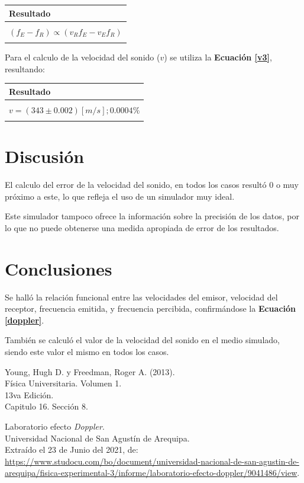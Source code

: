 \documentclass[letter,11pt]{article}
\begin{document}
\begin{center}
\begin{tabular}{|>{\centering}m{9.2cm}<{\centering}|}
\hline
\textbf{Resultado} 
\tabularnewline \hline
\\
$(f_E - f_R) \propto (v_R f_E - v_E f_R)$ \tabularnewline
\\
\hline
\end{tabular}
\end{center}

Para el calculo de la velocidad del sonido ($v$) se utiliza la
\textbf{Ecuación \ref{v3}}, resultando:

\begin{center}
\begin{tabular}{|>{\centering}m{9.2cm}<{\centering}|}
\hline
\textbf{Resultado} 
\tabularnewline \hline
\\
$v = (343 \pm 0.002) [m/s]; 0.0004\%$ \tabularnewline
\\
\hline
\end{tabular}
\end{center}

\section{Discusión}

El calculo del error de la velocidad del sonido, en todos los casos resultó 0 o
muy próximo a este, lo que refleja el uso de un simulador muy ideal.

Este simulador tampoco ofrece la información sobre la precisión de los datos,
por lo que no puede obtenerse una medida apropiada de error de los resultados.

\section{Conclusiones}

Se halló la relación funcional entre las velocidades del emisor, velocidad del
receptor, frecuencia emitida, y frecuencia percibida, confirmándose la
\textbf{Ecuación \ref{doppler}}.

También se calculó el valor de la velocidad del sonido en el medio simulado,
siendo este valor el mismo en todos los casos.

\begin{thebibliography}{99}

 Young, Hugh D. y Freedman, Roger A. (2013).\\
Física Universitaria. Volumen 1.\\
13va Edición.\\
Capitulo 16. Sección 8.

 Laboratorio efecto \emph{Doppler}.\\
Universidad Nacional de San Agustín de Arequipa. \\
Extraído el 23 de Junio del 2021, de:\\
{\small \url{https://www.studocu.com/bo/document/universidad-nacional-de-san-agustin-de-arequipa/fisica-experimental-3/informe/laboratorio-efecto-doppler/9041486/view}.}

\end{thebibliography}
\end{document}
